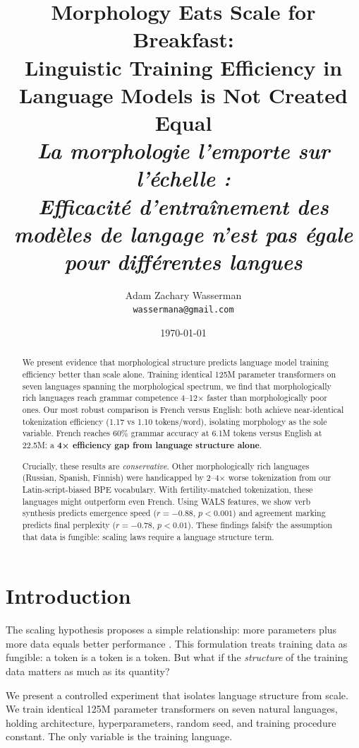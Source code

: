 \documentclass[11pt]{article}
\title{\textbf{Morphology Eats Scale for Breakfast:\\Linguistic Training Efficiency in Language Models is Not Created Equal}\\[0.5em]
\large\textit{La morphologie l'emporte sur l'échelle :\\Efficacité d'entraînement des modèles de langage n'est pas égale pour différentes langues}}
\author{
  Adam Zachary Wasserman\\
  \texttt{wassermana@gmail.com}
}
\date{\today}
\begin{document}
\maketitle


\begin{abstract}
We present evidence that morphological structure predicts language model training efficiency better than scale alone. Training identical 125M parameter transformers on seven languages spanning the morphological spectrum, we find that morphologically rich languages reach grammar competence 4--12× faster than morphologically poor ones. Our most robust comparison is French versus English: both achieve near-identical tokenization efficiency (1.17 vs 1.10 tokens/word), isolating morphology as the sole variable. French reaches 60\% grammar accuracy at 6.1M tokens versus English at 22.5M: a \textbf{4× efficiency gap from language structure alone}.

Crucially, these results are \textit{conservative}. Other morphologically rich languages (Russian, Spanish, Finnish) were handicapped by 2--4× worse tokenization from our Latin-script-biased BPE vocabulary. With fertility-matched tokenization, these languages might outperform even French. Using WALS features, we show verb synthesis predicts emergence speed ($r=-0.88$, $p<0.001$) and agreement marking predicts final perplexity ($r=-0.78$, $p<0.01$). These findings falsify the assumption that data is fungible: scaling laws require a language structure term.
\end{abstract}

\section{Introduction}

The scaling hypothesis proposes a simple relationship: more parameters plus more data equals better performance \citep{kaplan2020scaling, hoffmann2022training}. This formulation treats training data as fungible: a token is a token is a token. But what if the \textit{structure} of the training data matters as much as its quantity?

We present a controlled experiment that isolates language structure from scale. We train identical 125M parameter transformers on seven natural languages, holding architecture, hyperparameters, random seed, and training procedure constant. The only variable is the training language.
\end{document}

